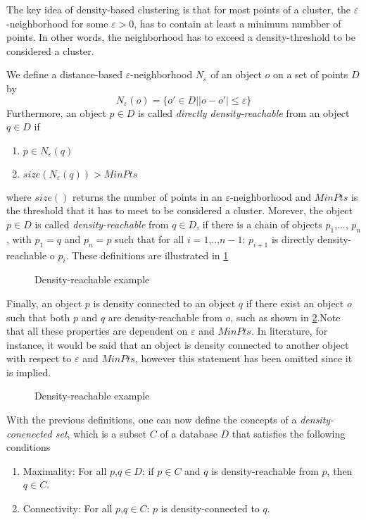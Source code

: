 The key idea of density-based clustering is that for most points of a cluster, the $\varepsilon$-neighborhood for some $\varepsilon > 0$, has to contain at least a minimum numbber of points. In other words, the neighborhood has to exceed a density-threshold to be considered a cluster. 

We define a distance-based $\varepsilon$-neighborhood  $N_\varepsilon$ of an object $o$  on a set of points $D$ by
\begin{equation}
	N_\varepsilon (o) = \{ o'\in D| |o-o'|\leq \varepsilon\}
\end{equation}
Furthermore, an object $p \in D$ is called \textit{directly density-reachable} from an object $q \in D$ if
\begin{enumerate}
	\item $p \in N_\varepsilon(q)$
	\item $size(N_\varepsilon(q))> MinPts$
\end{enumerate}
where $size()$ returns the number of points in an $\varepsilon$-neighborhood and $MinPts$ is the threshold that it has to meet to be considered a cluster. Morever, the object $p\in D$ is called \textit{density-reachable} from $q \in D$, if there is a chain of objects $p_1$,..., $p_n$, with $p_1 = q$ and $p_n =p$ such that for all $i =1$,..,$n-1$: $p_{i+1}$ is directly density-reachable o $p_{i}$. These definitions are illustrated in \cref{fig:density}

\begin{figure}[h]
	\centering
	
	\caption{Density-reachable example}
	\label{fig:density}
\end{figure} 

Finally, an object $p$ is density connected to an object $q$ if there exist an object $o$ such that both $p$ and $q$ are density-reachable from $o$, such as shown in \cref{fig:densityconn}.Note that all these properties are dependent on $\varepsilon$ and $MinPts$. In literature, for instance, it would be said that an object is density connected to another object with respect to $\varepsilon$ and $MinPts$, however this statement has been omitted since it is implied. 
\begin{figure}[h!]
	\centering
	
	\caption{Density-reachable example}
	\label{fig:densityconn}
\end{figure} 

With the previous definitions, one can now define the concepts of a \textit{density-conenected set}, which is a subset $C$ of a database $D$ that satisfies the following conditions 
\begin{enumerate}
	\item Maximality: For all $p$,$q \in D$: if $p \in C$ and $q$ is density-reachable from $p$, then $q\in C$.
	\item Connectivity: For all $p$,$q\in C$: $p$ is density-connected to $q$. 
\end{enumerate}

